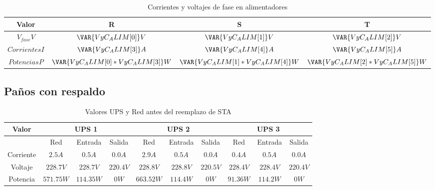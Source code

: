 \documentclass{article}
\begin{document}
\begin{center}
    \begin{table}[H]
        \centering
        \begin{tabular}{c c c c}
            Valor & R & S & T \\\hline
            $V_{fase}V$ & $\VAR{VyC_ALIM[0]} V$ & $\VAR{VyC_ALIM[1]} V$  & $\VAR{VyC_ALIM[2]} V$ \\
            $Corrientes I$ & $\VAR{VyC_ALIM[3]} A$  & $\VAR{VyC_ALIM[4]} A$  & $\VAR{VyC_ALIM[5]} A$ \\
	    $Potencias P$ & $\VAR{VyC_ALIM[0]*VyC_ALIM[3]} W$ & $\VAR{VyC_ALIM[1]*VyC_ALIM[4]} W$  & $\VAR{VyC_ALIM[2]*VyC_ALIM[5]} W$ 
        \end{tabular}
        \caption{Corrientes y voltajes de fase en alimentadores}
        \label{tab:alimentadores}
    \end{table}
\end{center}

\subsection{Paños con respaldo}

\begin{center}
    \begin{table}[H]
        \centering
        \begin{tabular}{c | c c c | c c c | c c c}
            Valor & \multicolumn{3}{c}{UPS 1} & \multicolumn{3}{c}{UPS 2} & \multicolumn{3}{c}{UPS 3}  \\\hline
            & Red & Entrada & Salida & Red & Entrada & Salida & Red & Entrada & Salida \\ 
            Corriente & $2.5 A$ & $0.5 A$ & $0.0 A$ & $2.9 A$ & $0.5 A$ & $0.0 A$ & $0.4 A$ & $0.5 A$ & $0.0 A$\\
            Voltaje & $228.7 V$ & $228.7 V$ & $220.4 V$ & $228.8 V$ & $228.8 V$ & $220.5 V $ & $228.4 V$ & $ 228.4 V$ & $ 220.4 V$ \\ 
            Potencia & $ 571.75 W $ & $114.35 W$ & $0 W$ & $ 663.52 W$ & $114.4 W$ & $0 W$ & $91.36 W$ & $114.2 W$ & $0 W$ \\
        \end{tabular}
        \caption{Valores UPS y Red antes del reemplazo de STA}
        \label{tab:UPSes}
    \end{table}
\end{center}
\end{document}
